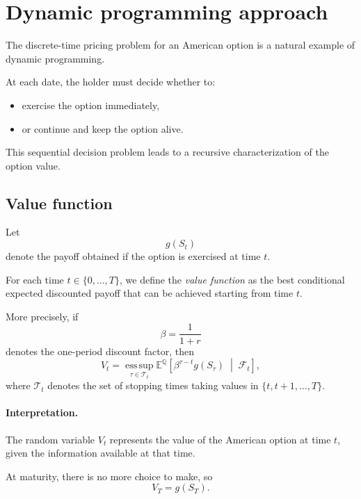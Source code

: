 \documentclass[11pt]{article}
\newcommand{\Qbb}{\mathbb{Q}}
\newcommand{\E}{\mathbb{E}}
\theoremstyle{definition}
\theoremstyle{plain}
\begin{document}
\section{Dynamic programming approach}

The discrete-time pricing problem for an American option is a natural
example of dynamic programming.

At each date, the holder must decide whether to:
\begin{itemize}[leftmargin=1.4em]
    \item exercise the option immediately,
    \item or continue and keep the option alive.
\end{itemize}

This sequential decision problem leads to a recursive characterization
of the option value.

\subsection{Value function}

Let
\[
g(S_t)
\]
denote the payoff obtained if the option is exercised at time \(t\).

For each time \(t\in\{0,\dots,T\}\), we define the \emph{value function}
as the best conditional expected discounted payoff that can be achieved
starting from time \(t\).

More precisely, if
\[
\beta=\frac{1}{1+r}
\]
denotes the one-period discount factor, then
\[
V_t
=
\operatorname*{ess\,sup}_{\tau\in\mathcal{T}_t}
\E^{\Qbb}\!\left[
\beta^{\tau-t} g(S_\tau)
\;\middle|\;
\mathcal{F}_t
\right],
\]
where \(\mathcal{T}_t\) denotes the set of stopping times taking values
in \(\{t,t+1,\dots,T\}\).

\paragraph{Interpretation.}
The random variable \(V_t\) represents the value of the American option
at time \(t\), given the information available at that time.

At maturity, there is no more choice to make, so
\[
V_T = g(S_T).
\]

\end{document}
